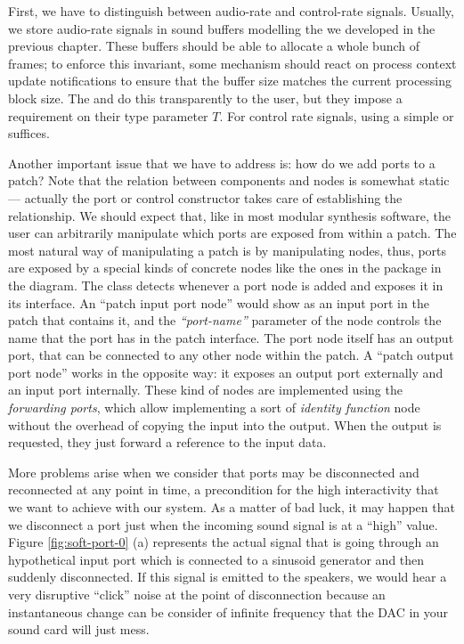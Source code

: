 First, we have to distinguish between audio-rate and control-rate
signals. Usually, we store audio-rate signals in sound buffers
modelling the  we developed in the previous
chapter. These buffers should be able to allocate a whole bunch of
 frames; to enforce this invariant, some mechanism
should react on process context update notifications to ensure that
the buffer size matches the current processing block size. The
 and  do this
transparently to the user, but they impose a 
requirement on their type parameter $T$. For control rate signals,
using a simple  or  suffices.

Another important issue that we have to address is: how do we add
ports to a patch? Note that the relation between components and nodes
is somewhat static --- actually the port or control constructor takes
care of establishing the relationship. We should expect that, like in
most modular synthesis software, the user can arbitrarily manipulate
which ports are exposed from within a patch. The most natural way of
manipulating a patch is by manipulating nodes, thus, ports are exposed
by a special kinds of concrete nodes like the ones in the 
package in the diagram. The  class detects whenever a port
node is added and exposes it in its interface. An ``patch input port
node'' would show as an input port in the patch that contains it, and
the \emph{``port-name''} parameter of the node controls the name that
the port has in the patch interface. The port node itself has an
output port, that can be connected to any other node within the
patch. A ``patch output port node'' works in the opposite way: it
exposes an output port externally and an input port internally. These
kind of nodes are implemented using the \emph{forwarding ports}, which
allow implementing a sort of \emph{identity function} node without the
overhead of copying the input into the output. When the output is
requested, they just forward a reference to the input data.

More problems arise when we consider that ports may be disconnected
and reconnected at any point in time, a precondition for the high
interactivity that we want to achieve with our system. As a matter of
bad luck, it may happen that we disconnect a port just when the
incoming sound signal is at a ``high'' value. Figure
\ref{fig:soft-port-0} (a) represents the actual signal that is going
through an hypothetical input port which is connected to a sinusoid
generator and then suddenly disconnected. If this signal is emitted to
the speakers, we would hear a very disruptive ``click'' noise at the
point of disconnection because an instantaneous change can be consider
of infinite frequency that the DAC in your sound card will just mess.

